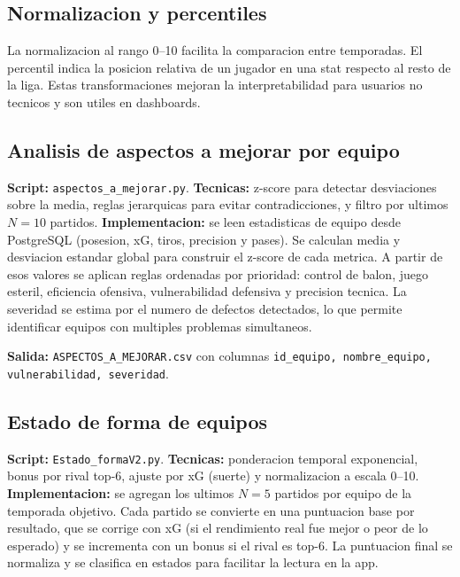 \subsection{Normalizacion y percentiles}
La normalizacion al rango 0--10 facilita la comparacion entre temporadas. El percentil indica la posicion relativa de un jugador en una stat respecto al resto de la liga. Estas transformaciones mejoran la interpretabilidad para usuarios no tecnicos y son utiles en dashboards.

\subsection{Analisis de aspectos a mejorar por equipo}
\textbf{Script:} \texttt{aspectos\_a\_mejorar.py}.\newline
\textbf{Tecnicas:} z-score para detectar desviaciones sobre la media, reglas jerarquicas para evitar contradicciones, y filtro por ultimos $N=10$ partidos.\newline
\textbf{Implementacion:} se leen estadisticas de equipo desde PostgreSQL (posesion, xG, tiros, precision y pases). Se calculan media y desviacion estandar global para construir el z-score de cada metrica. A partir de esos valores se aplican reglas ordenadas por prioridad: control de balon, juego esteril, eficiencia ofensiva, vulnerabilidad defensiva y precision tecnica. La severidad se estima por el numero de defectos detectados, lo que permite identificar equipos con multiples problemas simultaneos.

\textbf{Salida:} \texttt{ASPECTOS\_A\_MEJORAR.csv} con columnas \texttt{id\_equipo, nombre\_equipo, vulnerabilidad, severidad}.

\subsection{Estado de forma de equipos}
\textbf{Script:} \texttt{Estado\_formaV2.py}.\newline
\textbf{Tecnicas:} ponderacion temporal exponencial, bonus por rival top-6, ajuste por xG (suerte) y normalizacion a escala 0--10.\newline
\textbf{Implementacion:} se agregan los ultimos $N=5$ partidos por equipo de la temporada objetivo. Cada partido se convierte en una puntuacion base por resultado, que se corrige con xG (si el rendimiento real fue mejor o peor de lo esperado) y se incrementa con un bonus si el rival es top-6. La puntuacion final se normaliza y se clasifica en estados para facilitar la lectura en la app.

